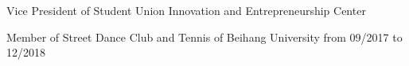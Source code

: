 

\begin{cventries}
  
  \cventry
    {}
    {Vice President of Student Union Innovation and Entrepreneurship Center}
    {}
    {}
    {}

  \cventry
    {}
    {Member of Street Dance Club and Tennis of Beihang University from 09/2017 to 12/2018}
    {}
    {}
    {}

\end{cventries}
